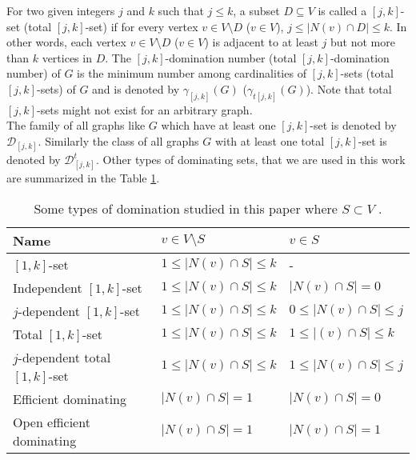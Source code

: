 \documentclass[A4,12pt]{article}
\theoremstyle{definition}
\theoremstyle{remark}
\begin{document}
	For two given integers $j$ and $k$ such that $j \leq k$, a subset $D \subseteq V$ is called a $[j, k]$-set (total $[j, k]$-set) if for every vertex $v \in V\setminus D$ ($v \in V$), $j \leq |N(v) \cap D| \leq k$. In other words, each vertex $v \in V \setminus D$ ($v \in V$) is adjacent to at least $j$ but not more than $k$ vertices in $D$.
	The $[j, k]$-domination number  (total $[j, k]$-domination number) of $G$ is the minimum number among cardinalities of $[j, k]$-sets (total $[j, k]$-sets) of $G$ and is denoted by $\gamma_{[j,k]}(G)$ ($\gamma_{t[j,k]}(G)$). Note that total $[j,k]$-sets might not exist for an arbitrary graph.
	\\
	The family of all graphs like $G$ which have at least one $[j,k]$-set is denoted by  $\mathcal{D}_{[j,k]}$. Similarly  the class of all graphs $G$ with at least one total $[j,k]$-set is denoted by $\mathcal{D}^t_{[j,k]}$.
		Other types of dominating sets, that we are used in this work are summarized  in the Table \ref{table1}.
	

	
	\begin{table}[h]
		\begin{center}
			\caption{Some types of domination studied in this paper where $S\subset V$ .}\label{table1}
			\begin{tabular}{lll}
				\hline
				Name &  $v \in V\setminus S$ &  $v \in S$\\
				\hline
				
				$[1,k]$-set & $1\leq \vert N(v)\cap S \vert \leq k$ & -\\
				Independent $[1,k]$-set & $1\leq \vert N(v)\cap S \vert \leq k $ & $ \vert N(v)\cap S \vert =0$  \\
				$j$-dependent $[1,k]$-set & $1\leq \vert N(v)\cap S\vert \leq k$ & $0\leq \vert N(v)\cap S \vert \leq j$ \\
				Total $[1,k]$-set &  $1\leq\vert N(v)\cap S \vert \leq k$ & $1\leq \vert(v)\cap S \vert  \leq k$\\
				$j$-dependent total $[1,k]$-set &  $1\leq \vert N(v)\cap S\vert  \leq k$ & $1\leq \vert N(v)\cap S \vert \leq j$\\
				Efficient dominating &  $\vert N(v)\cap S \vert =1$ & $ \vert N(v)\cap S\vert=0$\\
				Open efficient dominating & $\vert N(v)\cap S\vert =1$ & $\vert N(v)\cap S\vert=1$ \\
			\end{tabular}
			
		\end{center}
	\end{table}
	
\end{document}
